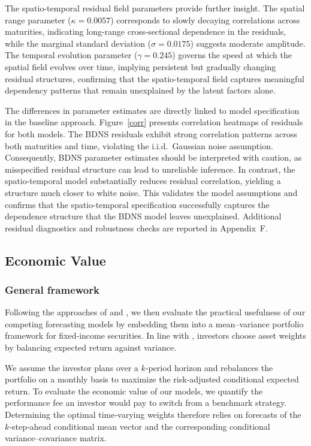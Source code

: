 \documentclass[
  12pt]{article}
\begin{document}
The spatio-temporal residual field parameters provide further insight. The spatial range parameter ($\kappa = 0.0057$) corresponds to slowly decaying correlations across maturities, indicating long-range cross-sectional dependence in the residuals, while the marginal standard deviation ($\sigma = 0.0175$) suggests moderate amplitude. The temporal evolution parameter ($\gamma = 0.245$) governs the speed at which the spatial field evolves over time, implying persistent but gradually changing residual structures, confirming that the spatio-temporal field captures meaningful dependency patterns that remain unexplained by the latent factors alone.

The differences in parameter estimates are directly linked to model specification in the baseline approach. Figure~\ref{corr} presents correlation heatmaps of residuals for both models. The BDNS residuals exhibit strong correlation patterns across both maturities and time, violating the i.i.d.\ Gaussian noise assumption. Consequently, BDNS parameter estimates should be interpreted with caution, as misspecified residual structure can lead to unreliable inference. In contrast, the spatio-temporal model substantially reduces residual correlation, yielding a structure much closer to white noise. This validates the model assumptions and confirms that the spatio-temporal specification successfully captures the dependence structure that the BDNS model leaves unexplained. Additional residual diagnostics and robustness checks are reported in Appendix~F.

\subsection{Economic Value}
\subsubsection{General framework}
Following the approaches of \citet{carriero2012forecasting} and \citet{xiang2013regime}, we then evaluate the practical usefulness of our competing forecasting models by embedding them into a mean–variance portfolio framework for fixed‐income securities. In line with \citet{markowitz1952portfolio}, investors choose asset weights by balancing expected return against variance.

We assume the investor plans over a $k$‑period horizon and rebalances the portfolio on a monthly basis to maximize the risk-adjusted conditional expected return. To evaluate the economic value of our models, we quantify the performance fee an investor would pay to switch from a benchmark strategy. Determining the optimal time‑varying weights therefore relies on forecasts of the $k$‑step‑ahead conditional mean vector and the corresponding conditional variance–covariance matrix.
\end{document}
